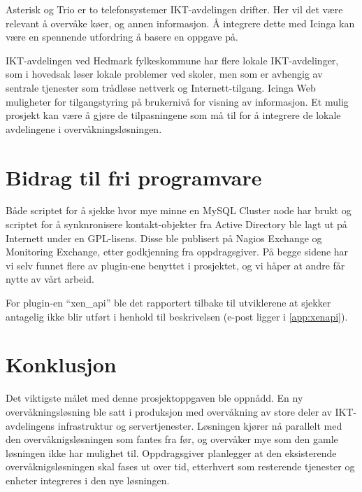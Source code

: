 Asterisk og Trio er to telefonsystemer IKT-avdelingen drifter. Her vil det være relevant å overvåke køer, og annen informasjon. Å integrere dette med Icinga kan være en spennende utfordring å basere en oppgave på.

IKT-avdelingen ved Hedmark fylkeskommune har flere lokale IKT-avdelinger, som i hovedsak løser lokale problemer ved skoler, men som er avhengig av sentrale tjenester som trådløse nettverk og Internett-tilgang. Icinga Web muligheter for tilgangstyring på brukernivå for visning av informasjon. Et mulig prosjekt kan være å gjøre de tilpasningene som må til for å integrere de lokale avdelingene i overvåkningsløsningen. 

\section{Bidrag til fri programvare}
Både scriptet for å sjekke hvor mye minne en MySQL Cluster node har brukt og scriptet for å synknronisere kontakt-objekter fra Active Directory ble lagt ut på Internett under en GPL-lisens. Disse ble publisert på Nagios Exchange\cite{monkeyexchange} og Monitoring Exchange\cite{monkeymonndb,monkeymonadsync}, etter godkjenning fra oppdragsgiver. På begge sidene har vi selv funnet flere av plugin-ene benyttet i prosjektet, og vi håper at andre får nytte av vårt arbeid.

For plugin-en ``xen\_api'' ble det rapportert tilbake til utviklerene at sjekker antagelig ikke blir utført i henhold til beskrivelsen (e-post ligger i \ref{app:xenapi}).

 
\section{Konklusjon}
Det viktigste målet med denne prosjektoppgaven ble oppnådd. En ny overvåkningsløsning ble satt i produksjon med overvåkning av store deler av IKT-avdelingens infrastruktur og servertjenester. Løsningen kjører nå parallelt med den overvåknigsløsningen som fantes fra før, og overvåker mye som den gamle løsningen ikke har mulighet til. Oppdragsgiver planlegger at den eksisterende overvåknigsløsningen skal fases ut over tid, etterhvert som resterende tjenester og enheter integreres i den nye løsningen. 

